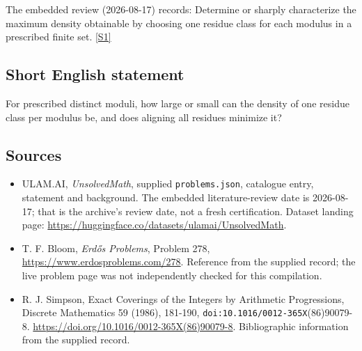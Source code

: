 \documentclass[11pt,a4paper]{article}
\newcommand{\sref}[2]{\hyperlink{source:#1:#2}{[S#2]}}
\begin{document}
The embedded review (2026-08-17) records: Determine or sharply characterize the maximum density obtainable by choosing one residue class for each modulus in a prescribed finite set. \sref{statement}{1}

\subsection{Short English statement}

For prescribed distinct moduli, how large or small can the density of one residue class per modulus be, and does aligning all residues minimize it?

\subsection{Sources}

{\small

\begin{itemize}

\item[\hypertarget{source:statement:1}{S1}] ULAM.AI, \emph{UnsolvedMath}, supplied \texttt{problems.json}, catalogue entry, statement and background. The embedded literature-review date is 2026-08-17; that is the archive’s review date, not a fresh certification. Dataset landing page: \url{https://huggingface.co/datasets/ulamai/UnsolvedMath}.

\item[\hypertarget{source:statement:2}{S2}] T. F. Bloom, \emph{Erdős Problems}, Problem 278, \url{https://www.erdosproblems.com/278}. Reference from the supplied record; the live problem page was not independently checked for this compilation.

\item[\hypertarget{source:statement:3}{S3}] R. J. Simpson, Exact Coverings of the Integers by Arithmetic Progressions, Discrete Mathematics 59 (1986), 181-190, \nolinkurl{doi:10.1016/0012-365X}(86)90079-8. \url{https://doi.org/10.1016/0012-365X(86)90079-8}. Bibliographic information from the supplied record.

\end{itemize}

}

\label{end:statement}
\end{document}
